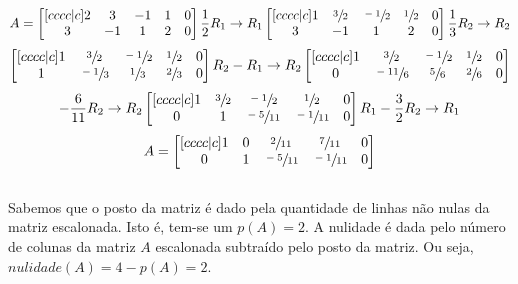 \begin{enumerate}
          \[A=
              \begin{bmatrix}[cccc|c]
                  2 & 3  & -1 & 1 & 0 \\
                  3 & -1 & 1  & 2 & 0
              \end{bmatrix}
              \frac{1}{2}R_1\to R_1
              \begin{bmatrix}[cccc|c]
                  1 & \sfrac{3}{2} & \sfrac{-1}{2} & \sfrac{1}{2} & 0 \\
                  3 & -1           & 1             & 2            & 0
              \end{bmatrix}
              \frac{1}{3}R_2\to R_2
          \]
          \[
              \begin{bmatrix}[cccc|c]
                  1 & \sfrac{3}{2}  & \sfrac{-1}{2} & \sfrac{1}{2} & 0 \\
                  1 & \sfrac{-1}{3} & \sfrac{1}{3}  & \sfrac{2}{3} & 0
              \end{bmatrix}
              R_2-R_1\to R_2
              \begin{bmatrix}[cccc|c]
                  1 & \sfrac{3}{2}   & \sfrac{-1}{2} & \sfrac{1}{2} & 0 \\
                  0 & \sfrac{-11}{6} & \sfrac{5}{6}  & \sfrac{2}{6} & 0
              \end{bmatrix}
          \]
          \[-\frac{6}{11}R_2\to R_2
              \begin{bmatrix}[cccc|c]
                  1 & \sfrac{3}{2} & \sfrac{-1}{2}  & \sfrac{1}{2}   & 0 \\
                  0 & 1            & \sfrac{-5}{11} & \sfrac{-1}{11} & 0
              \end{bmatrix}
              R_1-\frac{3}{2}R_2\to R_1
          \]
          \begin{equation}
              A=\begin{bmatrix}[cccc|c]
                  1 & 0 & \sfrac{2}{11}  & \sfrac{7}{11}  & 0 \\
                  0 & 1 & \sfrac{-5}{11} & \sfrac{-1}{11} & 0
              \end{bmatrix}
          \end{equation}
          \\

          Sabemos que o posto da matriz é dado pela quantidade de linhas não nulas da matriz escalonada. Isto é, tem-se um $p(A)=2$. A nulidade é dada pelo número de colunas da matriz $A$ escalonada subtraído pelo posto da matriz. Ou seja, $nulidade(A) = 4 - p(A) = 2$.
          \\


\end{enumerate}
